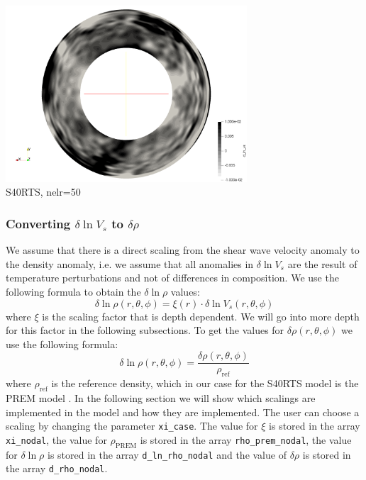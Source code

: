 \begin{center}
\includegraphics[width=9cm]{python_codes/fieldstone_71/images/dlnvsS40RTS_equator}\\
{\captionfont S40RTS, nelr=50}
\end{center}


\subsubsection*{Converting $\delta \ln V_s$ to $\delta \rho$}

We assume that there is a direct scaling from the shear wave velocity anomaly to the density anomaly, i.e. 
we assume that all anomalies in $\delta \ln{V_s}$ are the result of temperature perturbations and 
not of differences in composition. 
We use the following formula to obtain the $\delta \ln{\rho} $ values:
\[
\delta \ln{\rho(r, \theta, \phi)} = \xi(r) \cdot \delta \ln{V_s(r, \theta, \phi)} 
\]
where $\xi$ is the scaling factor that is depth dependent. We will go into more depth for this factor in the following subsections. To get the values for $\delta \rho(r, \theta, \phi)$ we use the following formula:
\[
\delta \ln{\rho(r, \theta, \phi)} = \frac{\delta \rho(r, \theta,\phi)}{\rho_\text{ref}} 
\]
where $\rho_\text{ref}$ is the reference density, which in our case for the S40RTS model is the PREM model 
\cite{dzan81}. In the following section we will show which scalings are implemented in the model and how 
they are implemented. The user can choose a scaling by changing the parameter \texttt{xi\_case}. 
The value for $\xi$ is stored in the array \texttt{xi\_nodal}, 
the value for $\rho_\text{PREM}$ is stored in the array \texttt{rho\_prem\_nodal}, 
the value for $\delta \ln{\rho}$ is stored in the array \texttt{d\_ln\_rho\_nodal} 
and the value of $\delta \rho$ is stored in the array \texttt{d\_rho\_nodal}.

